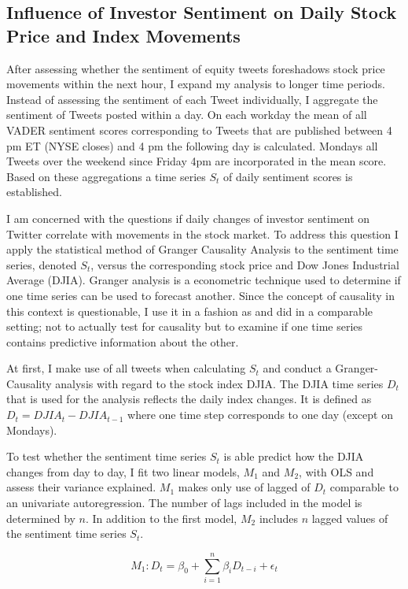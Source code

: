 \documentclass[a4paper,12pt]{article}%
\begin{document}
\subsection{Influence of Investor Sentiment on Daily Stock Price and Index Movements \label{granger_vader}}
After assessing whether the sentiment of equity tweets foreshadows stock price movements within the next hour, I expand my analysis to longer time periods. Instead of assessing the sentiment of each Tweet individually, I aggregate the sentiment of Tweets posted within a day. On each workday the mean of all VADER sentiment scores corresponding to Tweets that are published between 4 pm ET (NYSE closes) and 4 pm the following day is calculated. Mondays all Tweets over the weekend since Friday 4pm are incorporated in the mean score. Based on these aggregations a time series $S_t$ of daily sentiment scores is established.

I am concerned with the questions if daily changes of investor sentiment on Twitter correlate with movements in the stock market. To  address this question I apply the statistical method of Granger Causality Analysis to the sentiment time series, denoted $S_t$, versus the corresponding stock price and Dow Jones Industrial Average (DJIA). Granger analysis is a econometric technique used to determine if one time series can be used to forecast another. Since the concept of causality in this context is questionable, I use it in a fashion as \citet{Gilbert2010} and \citet{Bollen2011} did in a comparable setting; not to actually test for causality but to examine if one time series contains predictive information about the other.

At first, I make use of all tweets when calculating $S_t$ and conduct a Granger-Causality analysis with regard to the stock index DJIA. The DJIA time series $D_t$ that is used for the analysis reflects the daily index changes. It is defined as $D_t = DJIA_t - DJIA_{t-1}$ where one time step corresponds to one day (except on Mondays).

To test whether the sentiment time series $S_t$ is able predict how the DJIA changes from day to day, I fit two linear models, $M_1$ and $M_2$, with OLS and assess their variance explained. $M_1$ makes only use of lagged of $D_t$ comparable to an univariate autoregression. The number of lags included in the model is determined by $n$. In addition to the first model, $M_2$ includes $n$ lagged values of the sentiment time series $S_t$.

\begin{equation}
M_1: D_t = \beta_0 + \sum_{i=1}^n \beta_i D_{t-i} + \epsilon_t
\end{equation}
\end{document}
